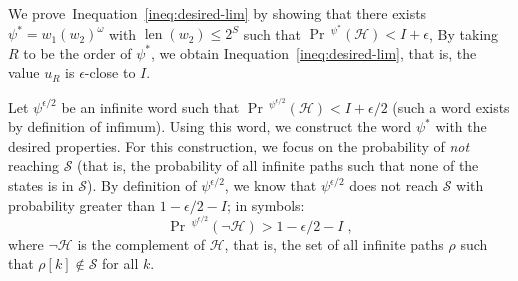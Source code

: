 \documentclass[final,3p,times,twocolumn]{elsarticle}
\theoremstyle{plain}
\theoremstyle{definition}
\newcommand{\states}{S}
\newcommand{\reachset}{\mathcal{S}}
\newcommand{\ipath}{\rho}
\newcommand{\fword}{w}
\newcommand{\infimum}{I}
\newcommand{\phit}{\mathcal{H}}
\newcommand{\pnhit}{\lnot\mathcal{H}}
\DeclareMathOperator{\lenWord}{len}
\newcommand{\len}[1]{\lenWord({#1})}
\newcommand{\iword}{\psi}
\DeclareMathOperator{\prWord}{Pr}
\newcommand{\ub}{u}
\newcommand{\recallInequation}[1]{Inequation~\ref{#1}}
\newcommand{\bigiter}{R}
\newcommand{\iwordeps}{\iword^{\epsilon/2}}
\newcommand{\pr}{\prWord\,\!}
\begin{document}
We prove~\recallInequation{ineq:desired-lim} by showing that there exists
$\iword^{*} = \fword_{1}(\fword_{2})^{\omega}$ with
$\len{\fword_{2}} \leq 2^{\states}$ such that $\pr^{\iword^{*}}(\phit)
														< \infimum + \epsilon$,
By taking $\bigiter$ to be the order of $\iword^{*}$, we obtain
\recallInequation{ineq:desired-lim}, that is, the value $\ub_{\bigiter}$
is $\epsilon$-close to $\infimum$.

Let $\iwordeps$ be an infinite word such that
$\pr^{\iwordeps}(\phit) < \infimum + \epsilon/2$ (such a word exists by
definition of infimum). Using this word, we construct the word $\iword^{*}$
with the desired properties. For this construction, we focus on
the probability of \emph{not} reaching $\reachset$ (that is, the probability of
all infinite paths such that none of the states is in $\reachset$).
By definition of $\iwordeps$, we know that $\iwordeps$ does not reach
$\reachset$ with probability greater than $1 - \epsilon/2 - \infimum$; in
symbols:
\begin{equation}
\label{ineq:iwordeps-gt-epsilon}
\pr^{\iwordeps}(\pnhit) > 1 - \epsilon/2 - \infimum \; ,
\end{equation}
where $\pnhit$ is the complement of $\phit$, that is, the set of all infinite
paths $\ipath$ such that $\ipath[k] \not\in \reachset$ for all $k$.
\end{document}
